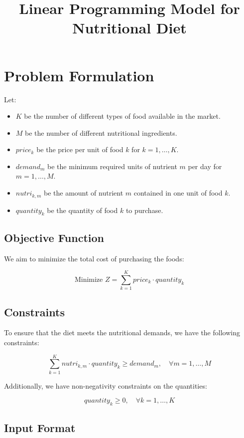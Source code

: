 \documentclass{article}
\begin{document}
\title{Linear Programming Model for Nutritional Diet}
\author{}
\date{}
\maketitle

\section*{Problem Formulation}

Let:
\begin{itemize}
    \item \( K \) be the number of different types of food available in the market.
    \item \( M \) be the number of different nutritional ingredients.
    \item \( price_k \) be the price per unit of food \( k \) for \( k = 1, \ldots, K \).
    \item \( demand_m \) be the minimum required units of nutrient \( m \) per day for \( m = 1, \ldots, M \).
    \item \( nutri_{k,m} \) be the amount of nutrient \( m \) contained in one unit of food \( k \).
    \item \( quantity_k \) be the quantity of food \( k \) to purchase.
\end{itemize}

\subsection*{Objective Function}

We aim to minimize the total cost of purchasing the foods:

\[
\text{Minimize } Z = \sum_{k=1}^{K} price_k \cdot quantity_k
\]

\subsection*{Constraints}

To ensure that the diet meets the nutritional demands, we have the following constraints:

\[
\sum_{k=1}^{K} nutri_{k, m} \cdot quantity_k \geq demand_m, \quad \forall m = 1, \ldots, M
\]

Additionally, we have non-negativity constraints on the quantities:

\[
quantity_k \geq 0, \quad \forall k = 1, \ldots, K
\]

\subsection*{Input Format}
\end{document}
